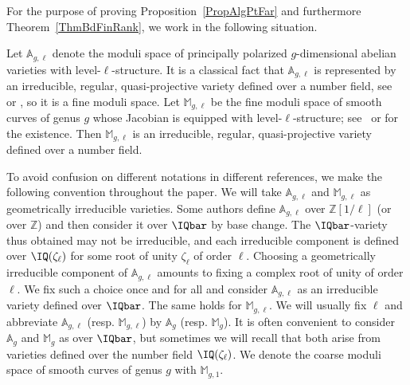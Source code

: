 For the purpose of proving Proposition~\ref{PropAlgPtFar} and
furthermore Theorem~\ref{ThmBdFinRank}, we work in the following
situation.



Let $\mathbb{A}_{g,\ell}$
denote the moduli space of principally polarized $g$-dimensional
abelian varieties with level-$\ell$-structure. It is
a classical fact that $\mathbb{A}_{g,\ell}$ is represented by an
 irreducible, regular, quasi-projective
variety defined over a number field,
see~\cite[Theorem~7.9 and below]{MFK:GIT94} or \cite[Theorem 1.9]{OortSteenbrink}, so it is a
fine moduli space.
Let $\mathbb{M}_{g,\ell}$ be the fine moduli space of smooth curves of genus
$g$ whose Jacobian is equipped with  level-$\ell$-structure;
see~\cite[(5.14)]{DM:irreducibility} or \cite[Theorem
1.8]{OortSteenbrink} for the existence.
Then $\mathbb{M}_{g,\ell}$ is an irreducible, regular, quasi-projective
variety defined over a number field.

To avoid confusion on different notations in different references, we
make the following convention throughout  the paper. We will take
$\mathbb{A}_{g,\ell}$ and $\mathbb{M}_{g,\ell}$ as geometrically
irreducible varieties.
 Some authors define
$\mathbb{A}_{g,\ell}$ over $\mathbb{Z}[1/\ell]$ (or over $\mathbb{Z}$)
and then consider it over $\IQbar$ by base change. The
$\IQbar$-variety thus obtained may not be irreducible, and each
irreducible component is defined over $\IQ(\zeta_{\ell})$ for some
 root of unity $\zeta_{\ell}$ of order $\ell$.
Choosing a geometrically irreducible component of $\mathbb{A}_{g,\ell}$
amounts to fixing a complex root of unity of order $\ell$.
We fix such a choice once and for all and consider
$\mathbb{A}_{g,\ell}$ as an irreducible variety defined over $\IQbar$.
The same  holds
for $\mathbb{M}_{g,\ell}$.
We will usually fix $\ell$ and abbreviate $\mathbb{A}_{g,\ell}$ (resp.
$\mathbb{M}_{g,\ell}$) by $\mathbb{A}_g$ (resp. $\mathbb{M}_g$).
It is often convenient to consider $\mathbb{A}_g$ and $\mathbb{M}_g$
as over $\IQbar$, but sometimes we will recall that both arise from
varieties defined over the number field $\IQ(\zeta_\ell)$.
We denote the coarse moduli space of smooth curves of genus $g$
with $\mathbb{M}_{g,1}$.

